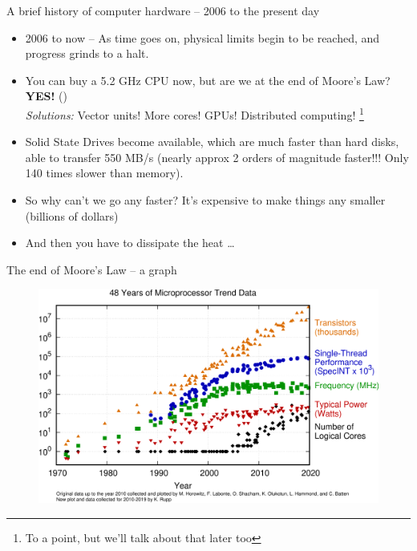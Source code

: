 \documentclass{beamer}
\begin{document}
\begin{frame}{A brief history of computer hardware -- 2006 to the present day}
	\begin{itemize}
		\item	2006 to now -- As time goes on, physical limits begin to be reached, and progress grinds to a halt.
		\item You can buy a 5.2 GHz CPU now, but are we at the end of Moore's Law? \textbf{YES!} (\cite{SophieWilson})\\
			\emph{Solutions:} Vector units! More cores! GPUs! Distributed computing! \footnote{To a point, but we'll talk about that later too}
		\item Solid State Drives become available, which are much faster than hard disks,
			able to transfer 550 MB/s (nearly approx 2 orders of magnitude faster!!! Only 140 times slower than memory). %
		\item So why can't we go any faster? It's expensive to make things any smaller (billions of dollars)
		\item And then you have to dissipate the heat \ldots
	\end{itemize}
	
\end{frame}

\begin{frame}{The end of Moore's Law -- a graph}
	\begin{figure}
		\includegraphics[scale=0.2]{48-years-processor-trend.png}
	\end{figure}
\end{frame}
\end{document}
